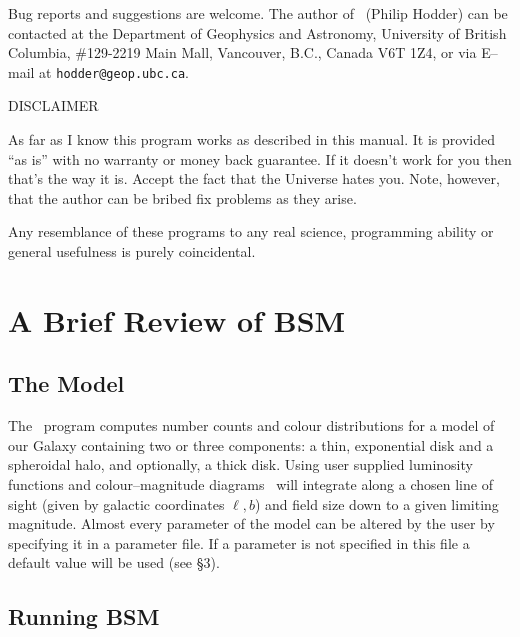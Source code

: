 \documentclass[11pt,twoside]{article}
\begin{document}
Bug reports and suggestions are welcome. The author of \bsm\ (Philip Hodder)
can be contacted at the Department of Geophysics and Astronomy, University of
British Columbia, \#129-2219 Main Mall, Vancouver, B.C., Canada V6T 1Z4, or
via E--mail at {\tt hodder@geop.ubc.ca}.

\vspace{10mm}
\centerline{DISCLAIMER}
\nin As far as I know this program works as described in this manual. It is
provided ``as is'' with no warranty or money back guarantee. If it doesn't
work for you then that's the way it is. Accept the fact that the Universe hates
you. Note, however, that the author can be bribed fix problems as they arise. 

\vspace{10mm}
\nin Any resemblance of these programs to any real science, programming 
ability or general usefulness is purely coincidental. 


\section{A Brief Review of BSM}
 
\subsection{The Model}

The \bsm\ program computes number
counts and colour distributions for a model of our Galaxy containing two or 
three components: a thin, exponential disk and a spheroidal halo, and 
optionally, a thick disk. Using user supplied luminosity functions and 
colour--magnitude diagrams \bsm\ will integrate along a chosen line of sight 
(given by galactic coordinates $\ell,b$) and field size down to a given
limiting magnitude. Almost every parameter of the model can be altered by the
user by specifying it in a parameter file. If a parameter is not specified in 
this file a default value will be used (see \S 3).
 
\subsection{Running BSM}
\end{document}
